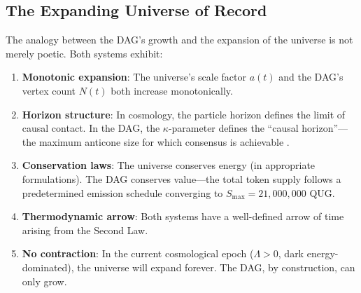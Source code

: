 \documentclass[12pt,a4paper]{article}
\theoremstyle{philosophical}
\begin{document}
\subsection{The Expanding Universe of Record}

The analogy between the DAG's growth and the expansion of the universe is not merely poetic. Both systems exhibit:

\begin{enumerate}[leftmargin=*]
\item \textbf{Monotonic expansion}: The universe's scale factor $a(t)$ and the DAG's vertex count $N(t)$ both increase monotonically.

\item \textbf{Horizon structure}: In cosmology, the particle horizon defines the limit of causal contact. In the DAG, the $\kappa$-parameter defines the ``causal horizon''---the maximum anticone size for which consensus is achievable \cite{qnk-physics}.

\item \textbf{Conservation laws}: The universe conserves energy (in appropriate formulations). The DAG conserves value---the total token supply follows a predetermined emission schedule converging to $S_{\max} = 21{,}000{,}000$ QUG.

\item \textbf{Thermodynamic arrow}: Both systems have a well-defined arrow of time arising from the Second Law.

\item \textbf{No contraction}: In the current cosmological epoch ($\Lambda > 0$, dark energy-dominated), the universe will expand forever. The DAG, by construction, can only grow.
\end{enumerate}

\end{document}
